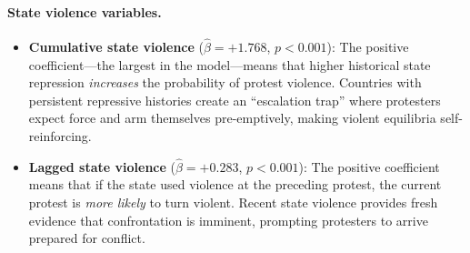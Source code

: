 \documentclass[12pt,a4paper]{article}
\begin{document}
\paragraph{State violence variables.}
\begin{itemize}
  \item \textbf{Cumulative state violence} ($\hat{\beta} = +1.768$, $p < 0.001$): The positive coefficient---the largest in the model---means that higher historical state repression \emph{increases} the probability of protest violence. Countries with persistent repressive histories create an ``escalation trap'' where protesters expect force and arm themselves pre-emptively, making violent equilibria self-reinforcing.
  \item \textbf{Lagged state violence} ($\hat{\beta} = +0.283$, $p < 0.001$): The positive coefficient means that if the state used violence at the preceding protest, the current protest is \emph{more likely} to turn violent. Recent state violence provides fresh evidence that confrontation is imminent, prompting protesters to arrive prepared for conflict.
\end{itemize}
\end{document}
